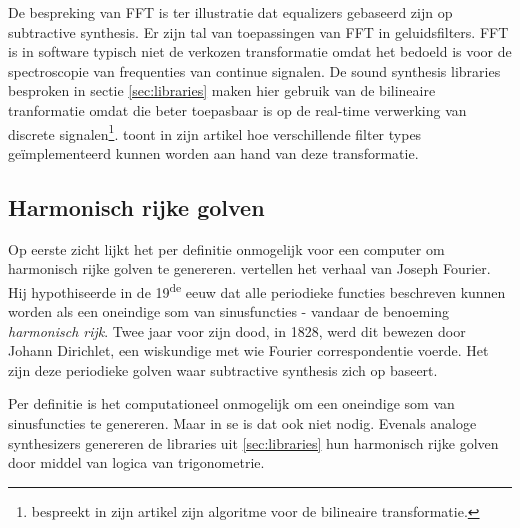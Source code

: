 De bespreking van FFT is ter illustratie dat equalizers gebaseerd zijn op subtractive synthesis. Er zijn tal van toepassingen van FFT in geluidsfilters. FFT is in software typisch niet de verkozen transformatie omdat het bedoeld is voor de spectroscopie van frequenties van continue signalen. De sound synthesis libraries besproken in sectie \ref{sec:libraries} maken hier gebruik van de bilineaire tranformatie \autocite{jsynbiquad} omdat die beter toepasbaar is op de real-time verwerking van discrete signalen\footnote{\textcite{rbj} bespreekt in zijn artikel zijn algoritme voor de bilineaire transformatie.}. \textcite{rbj} toont in zijn artikel hoe verschillende filter types geïmplementeerd kunnen worden aan hand van deze transformatie.

\subsection{Harmonisch rijke golven}

Op eerste zicht lijkt het per definitie onmogelijk voor een computer om harmonisch rijke golven te genereren. \textcite{fourier} vertellen het verhaal van Joseph Fourier. Hij hypothiseerde in de 19\textsuperscript{de} eeuw dat alle periodieke functies beschreven kunnen worden als een oneindige som van sinusfuncties - vandaar de benoeming \textit{harmonisch rijk}. Twee jaar voor zijn dood, in 1828, werd dit bewezen door Johann Dirichlet, een wiskundige met wie Fourier correspondentie voerde. Het zijn deze periodieke golven waar subtractive synthesis zich op baseert. 

Per definitie is het computationeel onmogelijk om een oneindige som van sinusfuncties te genereren.  Maar in se is dat ook niet nodig. Evenals analoge synthesizers genereren de libraries uit \ref{sec:libraries} hun harmonisch rijke golven door middel van logica van trigonometrie.